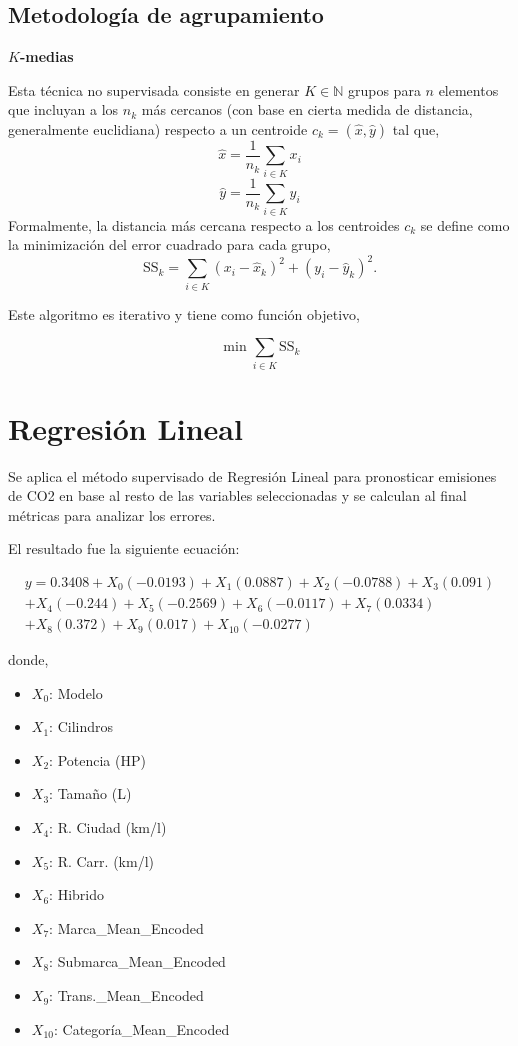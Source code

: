 \documentclass{article}
\begin{document}
\newpage

\subsection{Metodología de agrupamiento}

    \textbf{$K$-medias}\n

    Esta técnica no supervisada consiste en generar $K \in \mathbb{N}$ grupos para $n$ elementos que incluyan a los $n_k$ más cercanos (con base en cierta medida de distancia, generalmente euclidiana) respecto a un centroide $c_k = (\hat{x}, \hat{y})$ tal que\n,
    $$\hat{x} = \frac{1}{n_k} \sum_{i \in K} x_i$$ \n
    $$\hat{y} = \frac{1}{n_k} \sum_{i \in K} y_i$$ \n
    \n
    Formalmente, la distancia más cercana respecto a los centroides $c_k$ se define como la minimización del error cuadrado para cada grupo\n,
    $$\text{SS}_k = \sum_{i \in K} (x_i - \hat{x}_k)^2 + (y_i - \hat{y}_k)^2.$$\n

    Este algoritmo es iterativo y tiene como función objetivo\n,

    $$\min \sum_{i \in K} \text{SS}_k$$


\section{Regresión Lineal}

Se aplica el método supervisado de Regresión Lineal para pronosticar emisiones de CO2 en base al resto de las variables seleccionadas y se calculan al final métricas para analizar los errores.

El resultado fue la siguiente ecuación:

\begin{multline*}
y = 0.3408 + X_0 (-0.0193) + X_1 (0.0887) + X_2 (-0.0788) + X_3 (0.091) \\
+ X_4 (-0.244) + X_5 (-0.2569) + X_6 (-0.0117) + X_7 (0.0334) \\
+ X_8 (0.372) + X_9 (0.017) + X_{10} (-0.0277)
\end{multline*}

donde, 

\begin{itemize}
    \item $X_0$: Modelo
    \item $X_1$: Cilindros
    \item $X_2$: Potencia (HP)
    \item $X_3$: Tamaño (L)
    \item $X_4$: R. Ciudad (km/l)
    \item $X_5$: R. Carr. (km/l)
    \item $X_6$: Hibrido
    \item $X_7$: Marca\_Mean\_Encoded
    \item $X_8$: Submarca\_Mean\_Encoded
    \item $X_9$: Trans.\_Mean\_Encoded
    \item $X_{10}$: Categoría\_Mean\_Encoded
\end{itemize}
\end{document}
